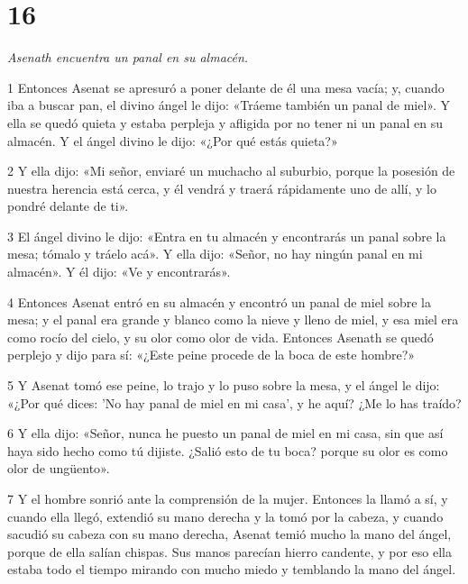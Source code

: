 \chapter{16}

\par \textit{Asenath encuentra un panal en su almacén.}

\par 1 Entonces Asenat se apresuró a poner delante de él una mesa vacía; y, cuando iba a buscar pan, el divino ángel le dijo: «Tráeme también un panal de miel». Y ella se quedó quieta y estaba perpleja y afligida por no tener ni un panal en su almacén. Y el ángel divino le dijo: «¿Por qué estás quieta?»

\par 2 Y ella dijo: «Mi señor, enviaré un muchacho al suburbio, porque la posesión de nuestra herencia está cerca, y él vendrá y traerá rápidamente uno de allí, y lo pondré delante de ti».

\par 3 El ángel divino le dijo: «Entra en tu almacén y encontrarás un panal sobre la mesa; tómalo y tráelo acá». Y ella dijo: «Señor, no hay ningún panal en mi almacén». Y él dijo: «Ve y encontrarás».

\par 4 Entonces Asenat entró en su almacén y encontró un panal de miel sobre la mesa; y el panal era grande y blanco como la nieve y lleno de miel, y esa miel era como rocío del cielo, y su olor como olor de vida. Entonces Asenath se quedó perplejo y dijo para sí: «¿Este peine procede de la boca de este hombre?»

\par 5 Y Asenat tomó ese peine, lo trajo y lo puso sobre la mesa, y el ángel le dijo: «¿Por qué dices: 'No hay panal de miel en mi casa', y he aquí? ¿Me lo has traído?

\par 6 Y ella dijo: «Señor, nunca he puesto un panal de miel en mi casa, sin que así haya sido hecho como tú dijiste. ¿Salió esto de tu boca? porque su olor es como olor de ungüento».

\par 7 Y el hombre sonrió ante la comprensión de la mujer. Entonces la llamó a sí, y cuando ella llegó, extendió su mano derecha y la tomó por la cabeza, y cuando sacudió su cabeza con su mano derecha, Asenat temió mucho la mano del ángel, porque de ella salían chispas. Sus manos parecían hierro candente, y por eso ella estaba todo el tiempo mirando con mucho miedo y temblando la mano del ángel.

